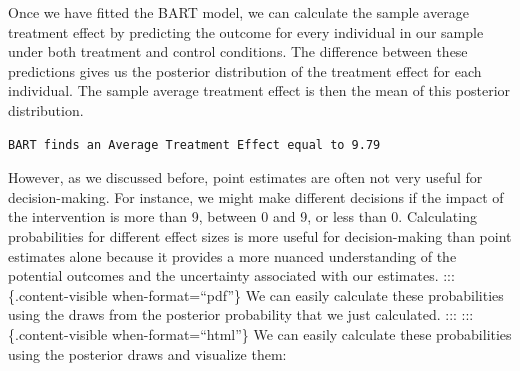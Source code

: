 \documentclass[
  letterpaper,
  DIV=11,
  numbers=noendperiod]{scrreprt}
\newenvironment{Shaded}{\begin{snugshade}}{\end{snugshade}}
\newcommand{\AttributeTok}[1]{\textcolor[rgb]{0.40,0.45,0.13}{#1}}
\newcommand{\ConstantTok}[1]{\textcolor[rgb]{0.56,0.35,0.01}{#1}}
\newcommand{\FunctionTok}[1]{\textcolor[rgb]{0.28,0.35,0.67}{#1}}
\newcommand{\NormalTok}[1]{\textcolor[rgb]{0.00,0.23,0.31}{#1}}
\newcommand{\OtherTok}[1]{\textcolor[rgb]{0.00,0.23,0.31}{#1}}
\newcommand{\SpecialCharTok}[1]{\textcolor[rgb]{0.37,0.37,0.37}{#1}}
\newcommand{\StringTok}[1]{\textcolor[rgb]{0.13,0.47,0.30}{#1}}
\begin{document}
Once we have fitted the BART model, we can calculate the sample average
treatment effect by predicting the outcome for every individual in our
sample under both treatment and control conditions. The difference
between these predictions gives us the posterior distribution of the
treatment effect for each individual. The sample average treatment
effect is then the mean of this posterior distribution.

\begin{Shaded}
\end{Shaded}

\begin{verbatim}
BART finds an Average Treatment Effect equal to 9.79
\end{verbatim}

However, as we discussed before, point estimates are often not very
useful for decision-making. For instance, we might make different
decisions if the impact of the intervention is more than 9, between 0
and 9, or less than 0. Calculating probabilities for different effect
sizes is more useful for decision-making than point estimates alone
because it provides a more nuanced understanding of the potential
outcomes and the uncertainty associated with our estimates. :::
\{.content-visible when-format=``pdf''\} We can easily calculate these
probabilities using the draws from the posterior probability that we
just calculated. ::: ::: \{.content-visible when-format=``html''\} We
can easily calculate these probabilities using the posterior draws and
visualize them:
\end{document}
